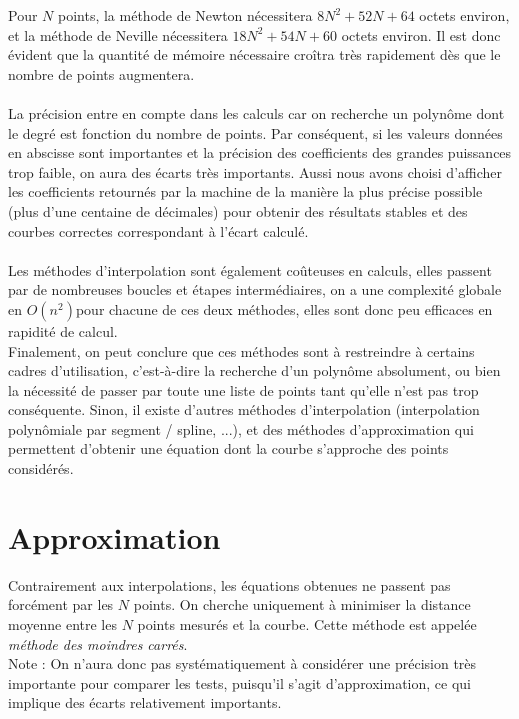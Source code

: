 \documentclass{report}
\begin{document}
      Pour $N$ points, la méthode de Newton nécessitera $8 N^{2}+52N+64$ octets environ, et la méthode de Neville nécessitera $18 N^{2} + 54N + 60$ octets environ. Il est donc évident que la quantité de mémoire nécessaire croîtra très rapidement dès que le nombre de points augmentera.\\ \\
      
      La précision entre en compte dans les calculs car on recherche un polynôme dont le degré est fonction du nombre de points. Par conséquent, si les valeurs données en abscisse sont importantes et la précision des coefficients des grandes puissances trop faible, on aura des écarts très importants. Aussi nous avons choisi d'afficher les coefficients retournés par la machine de la manière la plus précise possible (plus d'une centaine de décimales) pour obtenir des résultats stables et des courbes correctes correspondant à l'écart calculé.\\ \\
      
      Les méthodes d'interpolation sont également coûteuses en calculs, elles passent par de nombreuses boucles et étapes intermédiaires, on a une complexité globale en $O(n^2)$pour chacune de ces deux méthodes, elles sont donc peu efficaces en rapidité de calcul. \\
      Finalement, on peut conclure que ces méthodes sont à restreindre à certains cadres d'utilisation, c'est-à-dire la recherche d'un polynôme absolument, ou bien la nécessité de passer par toute une liste de points tant qu'elle n'est pas trop conséquente. Sinon, il existe d'autres méthodes d'interpolation (interpolation polynômiale par segment / spline, ...), et des méthodes d'approximation qui permettent d'obtenir une équation dont la courbe s'approche des points considérés.
      
  \chapter{Approximation}
    Contrairement aux interpolations, les équations obtenues ne passent pas forcément par les $N$ points. On cherche uniquement à minimiser la distance moyenne entre les $N$ points mesurés et la courbe. Cette méthode est appelée \textit{méthode des moindres carrés}.\\
    Note : On n'aura donc pas systématiquement à considérer une précision très importante pour comparer les tests, puisqu'il s'agit d'approximation, ce qui implique des écarts relativement importants.
\end{document}

